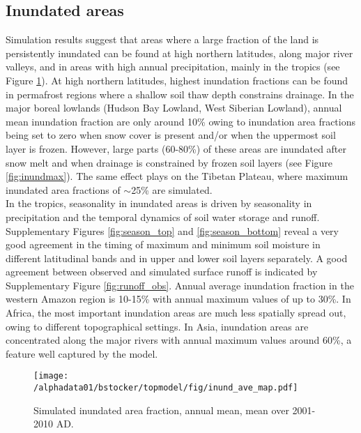 \subsection{Inundated areas}
Simulation results suggest that areas where a large fraction of the land is persistently inundated can be found at high northern latitudes, along major river valleys, and in areas with high annual precipitation, mainly in the tropics (see Figure \ref{fig:inundave}). At high northern latitudes, highest inundation fractions can be found in permafrost regions where a shallow soil thaw depth constrains drainage. In the major boreal lowlands (Hudson Bay Lowland, West Siberian Lowland), annual mean inundation fraction are only around 10\% owing to inundation area fractions being set to zero when snow cover is present and/or when the uppermost soil layer is frozen. However, large parts (60-80\%) of these areas are inundated after snow melt and when drainage is constrained by frozen soil layers (see Figure \ref{fig:inundmax}). The same effect plays on the Tibetan Plateau, where maximum inundated area fractions of $\sim$25\% are simulated.\\

In the tropics, seasonality in inundated areas is driven by seasonality in precipitation and the temporal dynamics of soil water storage and runoff. Supplementary Figures \ref{fig:season_top} and \ref{fig:season_bottom} reveal a very good agreement in the timing of maximum and minimum soil moisture in different latitudinal bands and in upper and lower soil layers separately. A good agreement between observed and simulated surface runoff is indicated by Supplementary Figure \ref{fig:runoff_obs}. Annual average inundation fraction in the western Amazon region is 10-15\% with annual maximum values of up to 30\%. In Africa, the most important inundation areas are much less spatially spread out, owing to different topographical settings. In Asia, inundation areas are concentrated along the major rivers with annual maximum values around 60\%, a feature well captured by the model.\\

\begin{figure}[ht!]
\begin{center}
  \texttt{[image: /alphadata01/bstocker/topmodel/fig/inund\_ave\_map.pdf]}
\end{center}
\caption{Simulated inundated area fraction, annual mean, mean over 2001-2010 AD.}
\label{fig:inundave}
\end{figure}

